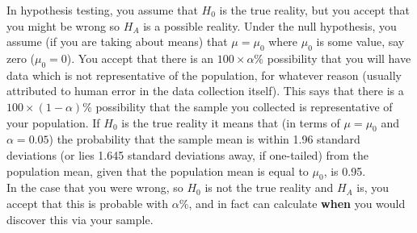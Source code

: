 \FloatBarrier
In hypothesis testing, you assume that $H_0$ is the true reality, but you accept that you might be wrong so $H_A$ is a possible reality. Under the null hypothesis, you assume (if you are taking about means) that $\mu=\mu_0$ where $\mu_0$ is some value, say zero ($\mu_0=0$). You accept that there is an $100 \times\alpha$\% possibility that you will have data which is not representative of the population, for whatever reason (usually attributed to human error in the data collection itself). This says that there is a $100 \times(1-\alpha)$\% possibility that the sample you collected is representative of your population. If $H_0$ is the true reality it means that (in terms of $\mu=\mu_0$ and $\alpha = 0.05$) the probability that the sample mean is within 1.96 standard deviations (or lies 1.645 standard deviations away, if one-tailed) from the population mean, given that the population mean is equal to $\mu_0$, is 0.95. 
\\
In the case that you were wrong, so $H_0$ is not the true reality and $H_A$ is, you accept that this is probable with $\alpha$\%, and in fact can calculate \textbf{when} you would discover this via your sample. 

